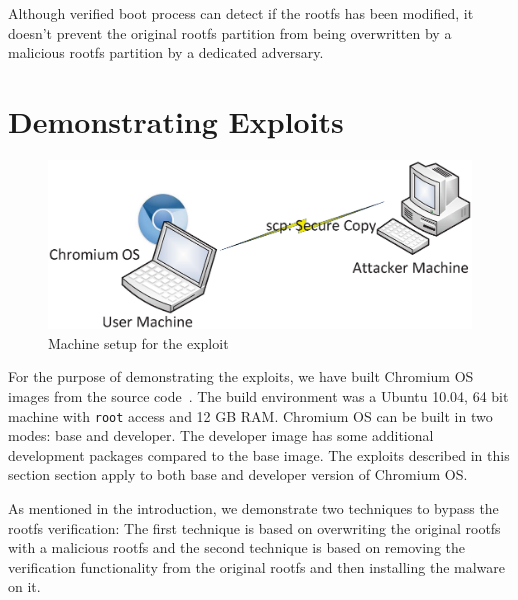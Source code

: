 \documentclass[11pt]{article}
\begin{document}
Although verified boot process can detect if the rootfs has been modified, it doesn't prevent the original rootfs partition from being overwritten by a malicious rootfs partition by a dedicated adversary.

\section{Demonstrating Exploits}
\begin{figure}[htbp]
  \centering
    \includegraphics[width=\columnwidth]{Figure/attack-environment.eps}
\caption{\small{Machine setup for the exploit}}
\label{fig:attack-environment}
\end{figure}
For the purpose of demonstrating the exploits, we have built Chromium OS images from the source code~\cite{crossource}. The build environment was a Ubuntu 10.04, 64 bit machine with \texttt{root} access and 12 GB RAM. Chromium OS can be built in two modes: base and developer. The developer image has some additional development packages compared to the base image. The exploits described in this section section apply to both base and developer version of Chromium OS.

As mentioned in the introduction, we demonstrate two techniques to bypass the rootfs verification: The first technique is based on overwriting the original rootfs with a malicious rootfs and the second technique is based on removing the verification functionality from the original rootfs and then installing the malware on it. 
\end{document}
